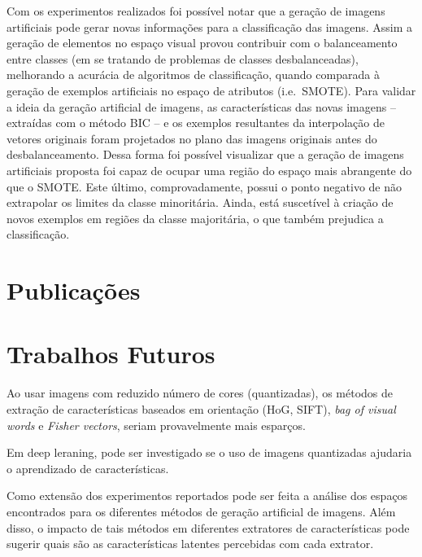 Com os experimentos realizados foi possível notar que a geração de imagens artificiais pode gerar novas informações para a classificação das imagens. Assim a geração de elementos no espaço visual provou contribuir com o balanceamento entre classes (em se tratando de problemas de classes desbalanceadas), melhorando a acurácia de algoritmos de classificação, quando comparada à geração de exemplos artificiais no espaço de atributos (i.e.\ SMOTE). Para validar a ideia da geração artificial de imagens, as características das novas imagens -- extraídas com o método BIC  -- e os exemplos resultantes da interpolação de vetores originais foram projetados no plano das imagens originais antes do desbalanceamento. Dessa forma foi possível visualizar que a geração de imagens artificiais proposta foi capaz de ocupar uma região do espaço mais abrangente do que o SMOTE. Este último, comprovadamente, possui o ponto negativo de não extrapolar os limites da classe minoritária. Ainda, está suscetível à criação de novos exemplos em regiões da classe majoritária, o que também prejudica a classificação.



\section{Publicações}

\section{Trabalhos Futuros}

Ao usar imagens com reduzido número de cores (quantizadas), os métodos de extração de características baseados em orientação (HoG, SIFT), \textit{bag of visual words} e \textit{Fisher vectors}, seriam provavelmente mais esparços.

Em deep leraning, pode ser investigado se o uso de imagens quantizadas ajudaria o aprendizado de características.

Como extensão dos experimentos reportados pode ser feita a análise dos espaços encontrados para os diferentes métodos de geração artificial de imagens. Além disso, o impacto de tais métodos em diferentes extratores de características pode sugerir quais são as características latentes percebidas com cada extrator.


